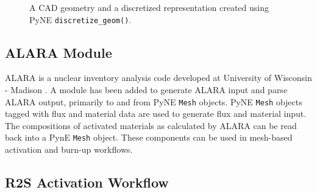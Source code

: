 \documentclass{anstrans}
\begin{document}
\begin{figure}
\centering
{}
\caption{A CAD geometry and a
discretized representation created using PyNE \texttt{discretize\_geom()}.}
\label{mobius}
\end{figure}


\subsection{ALARA Module}

ALARA is a nuclear inventory analysis code developed at University of Wisconsin
- Madison \cite{wilson_validation_1998}. A module has been added to generate
  ALARA input and parse ALARA output, primarily to and from PyNE \texttt{Mesh} objects. PyNE
\texttt{Mesh} objects tagged with flux and material data are used to generate
flux and material input. The compositions of activated materials as calculated by
ALARA can be read back into a PynE \texttt{Mesh} object. These components can be used
in mesh-based activation and burn-up workflows.

\subsection{R2S Activation Workflow}
\end{document}
